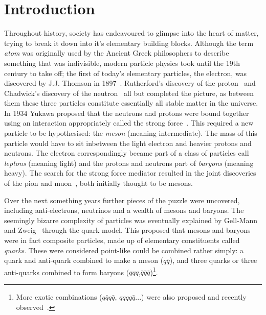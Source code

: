 \chapter{Introduction} 
\label{ch:introduction}

\minitoc 





Throughout history, society has endeavoured to glimpse into the heart of matter, trying to break it down into it's elementary building blocks.
Although the term \emph{atom} was originally used by the Ancient Greek philosophers to describe something that was indivisible, modern particle physics took until the 19th century to take off; the first of today's elementary particles, the electron, was discovered by J.J. Thomson in 1897~\cite{electron}.
Rutherford's discovery of the proton~\cite{Rutherford:1911zz} and Chadwick's discovery of the neutron~\cite{Chadwick:1932ma} all but completed the picture, as between them these three particles constitute essentially all stable matter in the universe.  
In 1934 Yukawa proposed that the neutrons and protons were bound together using an interaction appropriately called the strong force~\cite{193548}. This required a new particle to be hypothesised: the \emph{meson} (meaning intermediate). The mass of this particle would have to sit inbetween the light electron and heavier  protons and neutrons. The electron correspondingly became part of a class of particles call \emph{leptons} (meaning light) and the protons and neutrons part of \emph{baryons} (meaning heavy). 
The search for the strong force mediator resulted in the joint discoveries of the pion and muon~\cite{Lattes:1947mw,Lattes:1947mx}, both initially thought to be mesons. 


Over the next {\color{Red}something} years further pieces of the puzzle were uncovered, including anti-electrons, neutrinos and a wealth of mesons and baryons. 
The seemingly bizarre complexity of particles was eventually explained by Gell-Mann~\cite{GellMann:1964nj} and Zweig~\cite{Zweig:1964jf} through the quark model. This proposed that mesons and baryons were in fact composite particles, made up of elementary constituents called \emph{quarks}. These were considered point-like could be combined rather simply: a quark and anti-quark combined to make a meson ($q\bar{q}$), and three quarks or three anti-quarks combined to form baryons ($qqq$,$\bar{q}\bar{q}\bar{q}$)\footnote{More exotic combinations ($q\bar{q}q\bar{q}$, $qqqq\bar{q}$...) were also proposed and recently observed~\cite{PhysRevLett.91.262001,PhysRevLett.115.072001}.}.     


